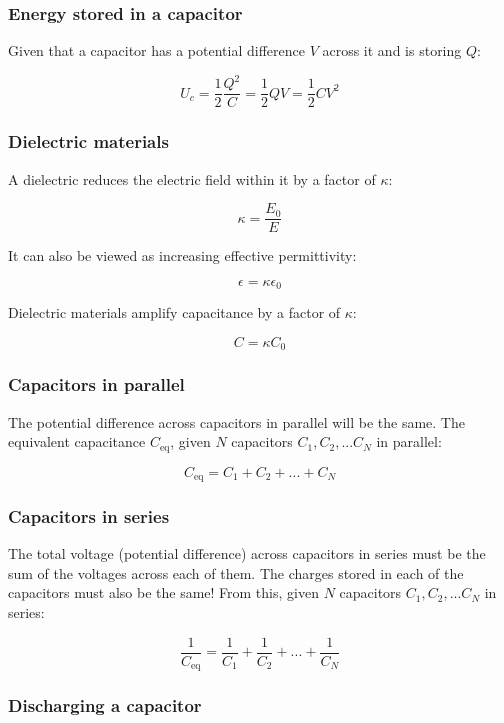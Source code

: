 \documentclass[12pt]{article}
\begin{document}
\subsubsection{Energy stored in a capacitor}

Given that a capacitor has a potential difference $V$ across it and is storing $Q$:

\[
\boxed{
U_c = \frac{1}{2}\frac{Q^2}{C} = \frac{1}{2}QV = \frac{1}{2}CV^2
}
\]

\subsubsection{Dielectric materials}

A dielectric reduces the electric field within it by a factor of $\kappa$:

\[
\boxed{
\kappa = \frac{E_0}{E}
}
\]

It can also be viewed as increasing effective permittivity:

\[
\boxed{
\epsilon = \kappa \epsilon_0
}
\]

Dielectric materials amplify capacitance by a factor of $\kappa$:

\[
\boxed{
C = \kappa C_0
}
\]

\newpage

\subsubsection{Capacitors in parallel}

The potential difference across capacitors in parallel will be the same.
The equivalent capacitance $C_{\text{eq}}$, given $N$ capacitors $C_1, C_2, ... C_N$ in parallel:

\[
\boxed{
C_{\text{eq}} = C_1 + C_2 + ... + C_N
}
\]

\subsubsection{Capacitors in series}

The total voltage (potential difference) across capacitors in series must be the sum of the voltages across each of them.
The charges stored in each of the capacitors must also be the same!
From this, given $N$ capacitors $C_1, C_2, ... C_N$ in series:

\[
\boxed{
\frac{1}{C_{\text{eq}}} = \frac{1}{C_1} + \frac{1}{C_2} + ... + \frac{1}{C_N}
}
\]

\subsubsection{Discharging a capacitor}
\end{document}
